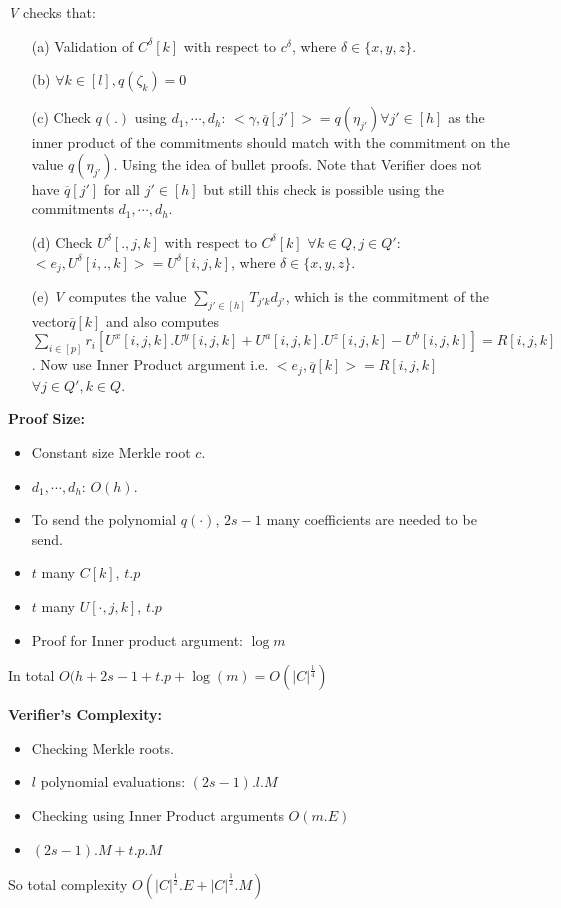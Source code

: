 \textit{V} checks that:
\begin{itemize}
	\item[(a)] Validation of $C^{\delta}[k]$ with respect to $c^{\delta}$, where $\delta\in\{x,y,z\}$. 
	\item[(b)] $\forall k\in[l], q(\zeta_k)=0$
	\item[(c)] Check $q(.)$ using $d_1,\cdots,d_h$: $<\gamma,\overline{q}[j']>=q(\eta_{j'})\forall j'\in[h]$ as the inner product of the commitments should match with the commitment on the value $q(\eta_{j'})$. Using the idea of bullet proofs. Note that Verifier does not have $\overline{q}[j'] $ for all $j'\in[h]$ but still this check is possible using the commitments $d_1,\cdots, d_h$.
	\item[(d)] Check $U^{\delta}[.,j,k]$ with respect to $C^{\delta}[k]$ $\forall k\in Q,  j\in Q'$: $<e_j,U^{\delta}[i,.,k]>=U^{\delta}[i,j,k]$, where $\delta\in\{x,y,z\}$. 
	\item[(e)] \textit{V} computes the value $\sum\limits_{j'\in[h]}T_{j'k}d_{j'}$, which is the commitment of the vector$\overline{q}[k]$ and also computes$\sum\limits_{i\in[p]} r_i[U^{x}[i,j,k].U^y[i,j,k]+U^{a}[i,j,k].U^z[i,j,k]-U^{b}[i,j,k]] =R[i,j,k]$. Now use Inner Product argument i.e. $<e_j,\overline{q}[k]>=R[i,j,k]$ $\forall j\in Q', k\in Q$.\\
\end{itemize}

\textbf{Proof Size:}
\begin{itemize}
	\item Constant size Merkle root $c$.
	\item $d_1,\cdots, d_h$: $O(h)$.
	\item To send the polynomial $q(\cdot)$, $2s-1$ many coefficients are needed to be send.
	\item $t$ many $C[k]$, $t.p$
	\item $t$ many $U[\cdot,j,k]$, $t.p$
	\item Proof for Inner product argument: $\log m$
\end{itemize}
In total $O(h+2s-1+t.p+\log(m) = O(|C|^{\frac{1}{4}})$

\textbf{Verifier's Complexity:}
\begin{itemize}
	\item Checking Merkle roots.
	\item $l$ polynomial evaluations: $(2s-1).l.M$
	\item Checking using Inner Product arguments $O(m.E)$
	\item $(2s-1).M+t.p.M$
\end{itemize}
So total complexity $O(|C|^{\frac{1}{2}}. E + |C|^{\frac{1}{2}}. M)$

